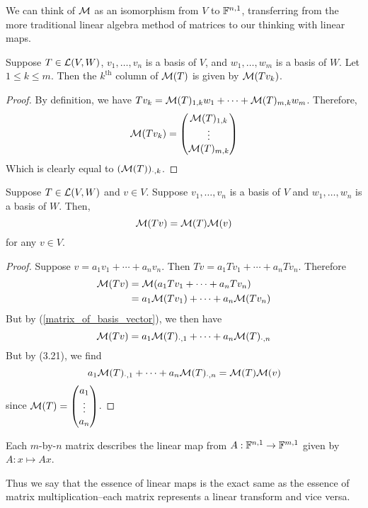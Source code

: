 We can think of $\mathcal{M}$ as an isomorphism from $V$ to $\mathbb F^{n, 1}$, transferring from the more traditional linear algebra method of matrices to our thinking with linear maps.
\begin{theorem}[$\matr(T)_{\cdot, k} = \matr(Tv_k)$] \label{matrix_of_basis_vector}
    Suppose $T\in\mathcal{L}(V,W)$, $v_1, \dots, v_n$ is a basis of $V$, and $w_1, \dots, w_m$ is a basis of $W$. Let $1 \le k \le m$. Then the $k^\text{th}$ column of $\mathcal{M}(T)$ is given by $\mathcal{M}(Tv_k)$.
\end{theorem}
\begin{proof}
    By definition, we have $Tv_k = \mathcal{M}(T)_{1,k}w_1 + \cdots + \mathcal{M}(T)_{m,k}w_m$. Therefore, 
    \[ \mathcal{M}(Tv_k) = \begin{pmatrix} \mathcal{M}(T)_{1,k} \\ \vdots \\ \mathcal{M}(T)_{m,k} \end{pmatrix}\]
    Which is clearly equal to $(\mathcal{M}(T))_{\cdot, k}$.
\end{proof}
\begin{theorem}
    Suppose $T\in\mathcal{L}(V,W)$ and $v\in V$. Suppose $v_1, \dots, v_n$ is a basis of $V$ and $w_1, \dots, w_n$ is a basis of $W$. Then,
    \[ \mathcal{M}(Tv) = \mathcal{M}(T)\mathcal{M}(v)\]
    for any $v\in V$.
\end{theorem}
\begin{proof}
    Suppose $v = a_1v_1 + \cdots + a_nv_n$. Then $Tv = a_1Tv_1 + \cdots + a_nTv_n$. Therefore
    \begin{align*}
        \mathcal{M}(Tv) &= \mathcal{M}(a_1Tv_1 + \cdots + a_nTv_n) \\
        &= a_1\mathcal{M}(Tv_1) + \cdots + a_n\mathcal{M}(Tv_n)
    \end{align*}
     But by (\ref{matrix_of_basis_vector}), we then have
     \[ \mathcal{M}(Tv) = a_1 \mathcal{M}(T)_{\cdot, 1} + \cdots + a_n\mathcal{M}(T)_{\cdot, n}\]
     But by (3.21), we find
     \[ a_1\mathcal{M}(T)_{\cdot, 1} + \cdots + a_n\mathcal{M}(T)_{\cdot, n} = \mathcal{M}(T)\mathcal{M}(v)\]
     since $\mathcal{M}(T) = \begin{pmatrix}a_1 \\ \vdots \\ a_n\end{pmatrix}$.
\end{proof}
Each $m$-by-$n$ matrix describes the linear map from $A: \mathbb F^{n,1}\to \mathbb F^{m,1}$ given by $A: x \mapsto Ax$.  

Thus we say that the essence of linear maps is the exact same as the essence of matrix multiplication--each matrix represents a linear transform and vice versa.    

